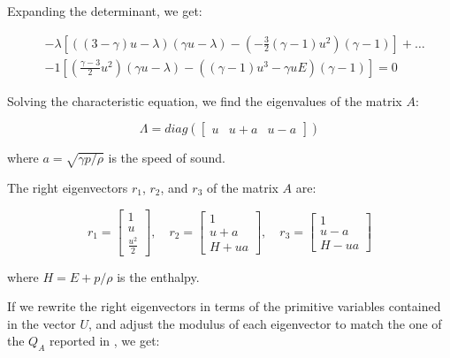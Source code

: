 Expanding the determinant, we get:

\begin{align}
     & -\lambda \left[ \left( (3 - \gamma) u - \lambda \right) \left(\gamma u - \lambda\right) - \left(-\frac{3}{2} (\gamma - 1) u^2 \right) \left( \gamma - 1\right) \right] + \dots \\
     & - 1 \left[ \left( \frac{\gamma - 3}{2} u^2 \right) \left( \gamma u - \lambda \right) - \left( (\gamma - 1) u^3 - \gamma u E \right) \left( \gamma - 1 \right) \right] = 0
\end{align}

Solving the characteristic equation, we find the eigenvalues of the matrix $A$:

\begin{equation}
    \Lambda = diag(\begin{bmatrix}
        u & u + a & u - a
    \end{bmatrix})
    \label{eq:matrix_Lambda}
\end{equation}

where $a = \sqrt{\gamma p / \rho}$ is the speed of sound.

The right eigenvectors $r_1$, $r_2$, and $r_3$ of the matrix $A$ are:

\begin{equation}
    r_1 = \begin{bmatrix}
        1 \\
        u \\
        \frac{u^2}{2}
    \end{bmatrix}, \quad
    r_2 = \begin{bmatrix}
        1     \\
        u + a \\
        H + u a
    \end{bmatrix}, \quad
    r_3 = \begin{bmatrix}
        1     \\
        u - a \\
        H - u a
    \end{bmatrix}
    \label{eq:right_eigenvectors}
\end{equation}

where $H = E + p / \rho$ is the enthalpy.

If we rewrite the right eigenvectors in terms of the primitive variables contained in the vector $U$, and adjust the modulus of each eigenvector to match the one of the $Q_A$ reported in \cite{Steger-Warming}, we get:

